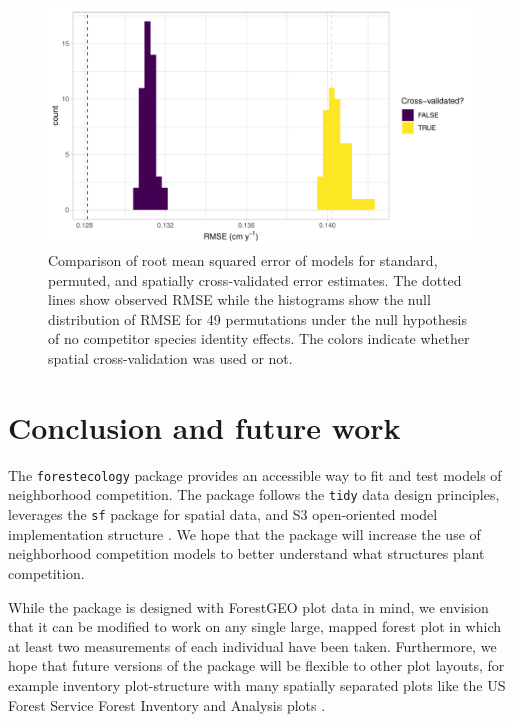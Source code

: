 \documentclass[12pt]{article}
\begin{document}
\begin{figure}

{\centering \includegraphics[width=1\linewidth]{simulation_results/2021-03-03_scbi_49_shuffles} 

}

\caption{Comparison of root mean squared error of models for standard, permuted, and spatially cross-validated error estimates. The dotted lines show observed RMSE while the histograms show the null distribution of RMSE for 49 permutations under the null hypothesis of no competitor species identity effects. The colors indicate whether spatial cross-validation was used or not.}\label{fig:scbi-simulation}
\end{figure}

\hypertarget{conclusion-and-future-work}{%
\section{Conclusion and future work}\label{conclusion-and-future-work}}

The \texttt{forestecology} package provides an accessible way to fit and
test models of neighborhood competition. The package follows the
\texttt{tidy} data design principles, leverages the \texttt{sf} package
for spatial data, and S3 open-oriented model implementation structure
\citep{pebesma_simple_2018}. We hope that the package will increase the
use of neighborhood competition models to better understand what
structures plant competition.

While the package is designed with ForestGEO plot data in mind, we
envision that it can be modified to work on any single large, mapped
forest plot in which at least two measurements of each individual have
been taken. Furthermore, we hope that future versions of the package
will be flexible to other plot layouts, for example inventory
plot-structure with many spatially separated plots like the US Forest
Service Forest Inventory and Analysis plots \citep{smith_forest_2002}.
\end{document}

